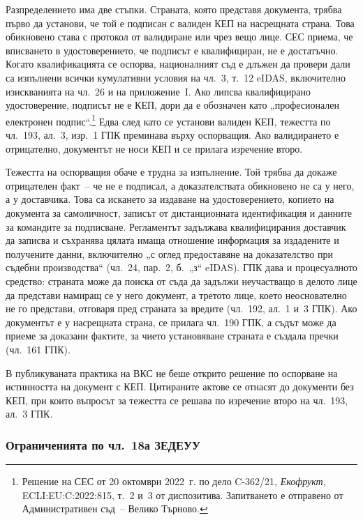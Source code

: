 Разпределението има две стъпки. Страната, която представя документа, трябва първо да
установи, че той е подписан с валиден КЕП на насрещната страна. Това обикновено става с
протокол от валидиране или чрез вещо лице. СЕС приема, че вписването в удостоверението,
че подписът е квалифициран, не е достатъчно. Когато квалификацията се оспорва, националният
съд е длъжен да провери дали са изпълнени всички кумулативни условия на чл.~3, т.~12
eIDAS, включително изискванията на чл.~26 и на приложение~I. Ако липсва квалифицирано
удостоверение, подписът не е КЕП, дори да е обозначен като „професионален електронен
подпис“.\footnote{Решение на СЕС от 20 октомври
2022~г. по дело C-362/21, \textit{Екофрукт}, ECLI:EU:C:2022:815, т.~2 и~3 от
диспозитива. Запитването е отправено от Административен съд~-- Велико Търново.} Едва след
като се установи валиден КЕП, тежестта по чл.~193, ал.~3, изр.~1 ГПК преминава върху
оспорващия. Ако валидирането е отрицателно, документът не носи КЕП и се прилага
изречение второ.

Тежестта на оспорващия обаче е трудна за изпълнение. Той трябва да докаже отрицателен
факт~-- че не е подписал, а доказателствата обикновено не са у него, а у доставчика. Това
са искането за издаване на удостоверението, копието на документа за самоличност, записът от
дистанционната идентификация и данните за командите за подписване. Регламентът задължава
квалифицирания доставчик да записва и съхранява цялата имаща отношение информация за
издадените и получените данни, включително „с оглед предоставяне на доказателство при
съдебни производства“ (чл.~24, пар.~2, б.~„з“ eIDAS). ГПК дава и процесуалното средство:
страната може да поиска от съда да задължи неучастващо в делото лице да представи
намиращ се у него документ, а третото лице, което неоснователно не го представи, отговаря
пред страната за вредите (чл.~192, ал.~1 и~3 ГПК). Ако документът е у насрещната страна,
се прилага чл.~190 ГПК, а съдът може да приеме за доказани фактите, за чието установяване
страната е създала пречки (чл.~161 ГПК).

В публикуваната практика на ВКС не беше открито решение по оспорване на истинността на
документ с КЕП. Цитираните актове се отнасят до документи без КЕП, при които въпросът за
тежестта се решава по изречение второ на чл.~193, ал.~3 ГПК.

\subsubsection{Ограниченията по чл.~18а ЗЕДЕУУ}
\label{sec:18a}

